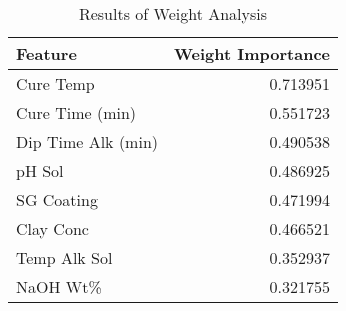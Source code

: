 
    \begin{table*}[h]
        \centering
        \begin{tabular}{lr}
\hline
 Feature            &   Weight Importance \\
\hline
 Cure Temp          &            0.713951 \\
 Cure Time (min)    &            0.551723 \\
 Dip Time Alk (min) &            0.490538 \\
 pH Sol             &            0.486925 \\
 SG Coating         &            0.471994 \\
 Clay Conc          &            0.466521 \\
 Temp Alk Sol       &            0.352937 \\
 NaOH Wt\%          &            0.321755 \\
\hline
\end{tabular}
        \caption{Results of Weight Analysis}
        \label{weight_analysis}
    \end{table*}
    

